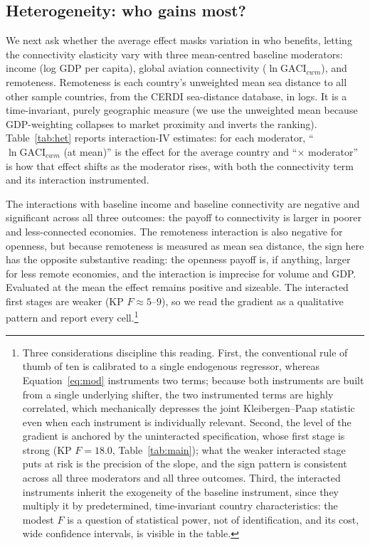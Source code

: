 \subsection{Heterogeneity: who gains most?}

We next ask whether the average effect masks variation in who benefits, letting
the connectivity elasticity vary with three mean-centred baseline moderators:
income (log GDP per capita), global aviation connectivity ($\ln\mathrm{GACI}_{cwm}$),
and remoteness. Remoteness is each country's unweighted mean sea distance to all
other sample countries, from the CERDI sea-distance database, in logs. It is a
time-invariant, purely geographic measure (we use the unweighted mean because
GDP-weighting collapses to market proximity and inverts the ranking).
Table~\ref{tab:het} reports interaction-IV estimates: for each moderator,
``$\ln\mathrm{GACI}_{cwm}$ (at mean)'' is the effect for the average country and
``$\times$ moderator'' is how that effect shifts as the moderator rises, with both
the connectivity term and its interaction instrumented.

The interactions with baseline income and baseline connectivity are negative and
significant across all three outcomes: the payoff to connectivity is larger in
poorer and less-connected economies. The remoteness interaction is also negative
for openness, but because remoteness is measured as mean sea distance, the sign
here has the opposite substantive reading: the openness payoff is, if anything,
larger for less remote economies, and the interaction is imprecise for volume
and GDP. Evaluated at the mean the effect remains positive and sizeable. The
interacted first stages are weaker (KP $F\approx5$--$9$), so we read the gradient
as a qualitative pattern and report every cell.\footnote{Three considerations
discipline this reading. First, the conventional rule of thumb of ten is
calibrated to a single endogenous regressor, whereas
Equation~\eqref{eq:mod} instruments two terms; because both instruments are
built from a single underlying shifter, the two instrumented terms are highly
correlated, which mechanically depresses the joint Kleibergen--Paap statistic
even when each instrument is individually relevant. Second, the level of the
gradient is anchored by the uninteracted specification, whose first stage is
strong (KP $F=18.0$, Table~\ref{tab:main}); what the weaker interacted stage
puts at risk is the precision of the slope, and the sign pattern is consistent
across all three moderators and all three outcomes. Third, the interacted
instruments inherit the exogeneity of the baseline instrument, since they
multiply it by predetermined, time-invariant country characteristics: the
modest $F$ is a question of statistical power, not of identification, and its
cost, wide confidence intervals, is visible in the table.}

